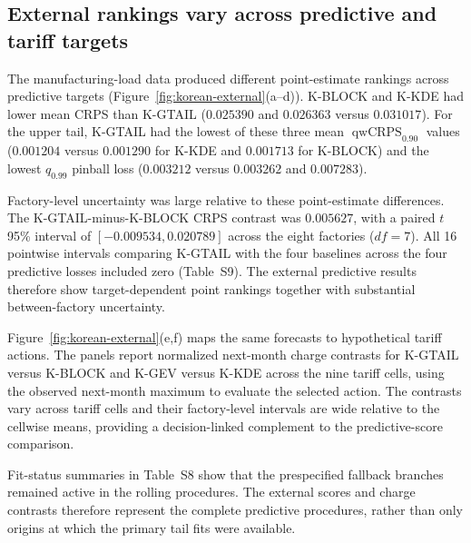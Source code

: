 \documentclass[Times1COL]{WileyNJDv5}
\begin{document}
\subsection{External rankings vary across predictive and tariff targets}
\label{sec:results-external}

The manufacturing-load data produced different point-estimate
rankings across predictive targets
(Figure~\ref{fig:korean-external}(a--d)). K-BLOCK and K-KDE had
lower mean CRPS than K-GTAIL ($0.025390$ and $0.026363$ versus
$0.031017$). For the upper tail, K-GTAIL had the lowest of these
three mean $\operatorname{qwCRPS}_{0.90}$ values
($0.001204$ versus $0.001290$ for K-KDE and $0.001713$ for
K-BLOCK) and the lowest $q_{0.99}$ pinball loss
($0.003212$ versus $0.003262$ and $0.007283$).

Factory-level uncertainty was large relative to these point-estimate
differences. The K-GTAIL-minus-K-BLOCK CRPS contrast was $0.005627$,
with a paired $t$ 95\% interval of $[-0.009534,0.020789]$ across the
eight factories ($df=7$). All 16 pointwise intervals comparing
K-GTAIL with the four baselines across the four predictive losses
included zero (Table~S9). The external predictive results therefore
show target-dependent point rankings together with substantial
between-factory uncertainty.

Figure~\ref{fig:korean-external}(e,f) maps the same forecasts to
hypothetical tariff actions. The panels report normalized next-month
charge contrasts for K-GTAIL versus K-BLOCK and K-GEV versus K-KDE
across the nine tariff cells, using the observed next-month maximum to
evaluate the selected action. The contrasts vary across tariff cells
and their factory-level intervals are wide relative to the cellwise
means, providing a decision-linked complement to the predictive-score
comparison.

Fit-status summaries in Table~S8 show that the prespecified fallback
branches remained active in the rolling procedures. The external scores
and charge contrasts therefore represent the complete predictive
procedures, rather than only origins at which the primary tail fits
were available.
\end{document}
